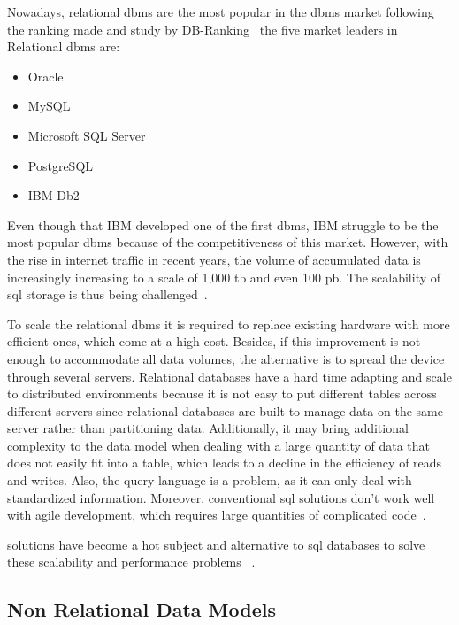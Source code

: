 Nowadays, relational \gls{dbms} are the most popular in the \gls{dbms} market following the ranking made and study by DB-Ranking~\cite{DBR} the five market leaders in Relational \gls{dbms} are:

\begin{itemize}
    \item Oracle
    \item MySQL
    \item Microsoft SQL Server
    \item PostgreSQL
    \item IBM Db2
\end{itemize}

Even though that IBM developed one of the first \gls{dbms}, IBM struggle to be the most popular \gls{dbms} because of the competitiveness of this market. However, with the rise in internet traffic in recent years, the volume of accumulated data is increasingly increasing to a scale of 1,000 \gls{tb} and even 100 \gls{pb}. The scalability of \gls{sql} storage is thus being challenged~\cite{wuoverview}.

To scale the relational \gls{dbms} it is required to replace existing hardware with more efficient ones, which come at a high cost. Besides, if this improvement is not enough to accommodate all data volumes, the alternative is to spread the device through several servers.
Relational databases have a hard time adapting and scale to distributed environments because it is not easy to put different tables across different servers since relational databases are built to manage data on the same server rather than partitioning data.  Additionally, it may bring additional complexity to the data model when dealing with a large quantity of data that does not easily fit into a table, which leads to a decline in the efficiency of reads and writes.  Also, the query language is a problem, as it can only deal with standardized information. Moreover, conventional \gls{sql} solutions don't work well with agile development, which requires large quantities of complicated code~\cite{han2011survey,wuoverview}.

  solutions have become a hot subject and alternative to \gls{sql} databases to solve these scalability and performance problems ~\cite{han2011survey,wuoverview}.

\subsection{Non Relational Data Models}

